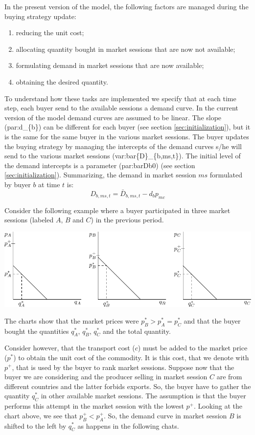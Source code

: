 \documentclass{article}
\begin{document}
In the present version of the model, the following factors are managed during the buying strategy update:
\begin{enumerate}
	\item reducing the unit cost;
	\item allocating quantity bought in market sessions that are now not available;
	\item formulating demand in market sessions that are now available;
	\item obtaining the desired quantity.
\end{enumerate}

To understand how these tasks are implemented we specify that at each time step, each buyer send to the available sessions a demand curve.
In the current version of the model demand curves are assumed to be linear. The slope (\gls{par:d_{b}}) can be different for each buyer (see section \ref{sec:initialization}), but it is the same for the same buyer in the various market sessions. The buyer updates the buying strategy by managing the intercepts of the demand curves s/he will send to the various market sessions (\gls{var:bar{D}_{b,ms,t}}). The initial level of the demand intercepts is a parameter (\gls{par:barDb0}) (see section \ref{sec:initialization}). Summarizing, the demand in market session $ms$ formulated by buyer $b$ at time $t$ is:
\[
	D_{b,ms,t}=\bar{D}_{b,ms,t}-d_bp_{mc}
\]

Consider the following example where a buyer participated in three market sessions (labeled $A$, $B$ and $C$) in the previous period.

\vskip5mm
\hskip-1.5cm
\includegraphics{fig_buying_strategy-0.pdf}

\vskip5mm
The charts show that the market prices were $p^*_B>p^*_A=p^*_C$ and that the buyer bought the quantities $q^*_A$, $q^*_B$, $q^*_C$ and the total quantity. 


Consider however, that the transport cost ($c$) must be added to the market price ($p^*$) to obtain the unit cost of the commodity. It is this cost, that we denote with $p^+$, that is used by the buyer to rank market sessions.   
Suppose now that the buyer we are considering and the producer selling in market session $C$ are from different countries and the latter forbids exports. So, the buyer have to gather the quantity $q^*_C$ in other available market sessions. The assumption is that the buyer performs this attempt in the market session with the lowest $p^+$. Looking at the chart above, we see that $p^+_B<p^+_A$. So, the demand curve in market session $B$ is shifted to the left by $q^*_C$ as happens in the following chats.   
\end{document}

